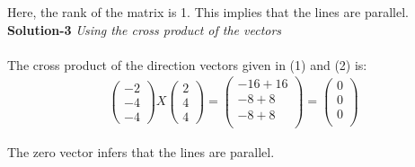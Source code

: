 \documentclass[a4paper,12pt]{article}
\begin{document}
\begin{flushleft}
Here, the rank of the matrix is 1. This implies that the lines are parallel.\\
\vspace{5mm}
\textbf{Solution-3} \textit{Using the cross product of the vectors}\\
\\
The cross product of the direction vectors given in (1) and (2) is: 
\begin{align*}
\begin{pmatrix} -2\\ -4\\ -4 \end{pmatrix} X
\begin{pmatrix}  2\\  4\\  4 \end{pmatrix} =
\begin{pmatrix}
 -16 + 16 \\
 -8+8 \\
 -8+8\\
\end{pmatrix}
=
\begin{pmatrix}
0 \\
0 \\
0\\
\end{pmatrix}
\end{align*}

The zero vector infers that the lines are parallel.

\end{flushleft}
\end{document}
